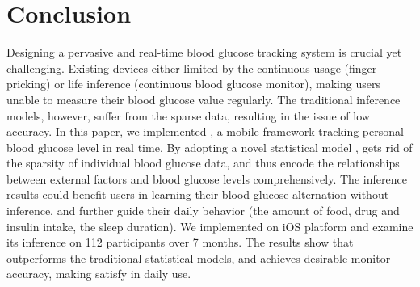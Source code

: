 
\section{Conclusion}
\label{sec:conclusion}

Designing a pervasive and real-time blood glucose tracking system is crucial yet challenging. Existing devices either limited by the continuous usage (\eg finger pricking) or life inference (\ie continuous blood glucose monitor), making users unable to measure their blood glucose value regularly.
The traditional inference models, however, suffer from the sparse data, resulting in the issue of low accuracy. 
In this paper, we implemented \sysname, a mobile framework tracking personal blood glucose level in real time. 
By adopting a novel statistical model \modelname, \sysname gets rid
of the sparsity of individual blood glucose data, and thus encode the relationships between external factors and blood glucose levels comprehensively. The inference results could benefit users in learning their
blood glucose alternation without inference, and further guide their daily behavior (\eg the amount of food, drug and insulin intake, the sleep duration). We implemented \sysname on iOS platform and examine its inference on 112 participants over 7 months. The results show that \modelname outperforms the traditional statistical models, and achieves desirable monitor accuracy, making \sysname satisfy in daily use.  